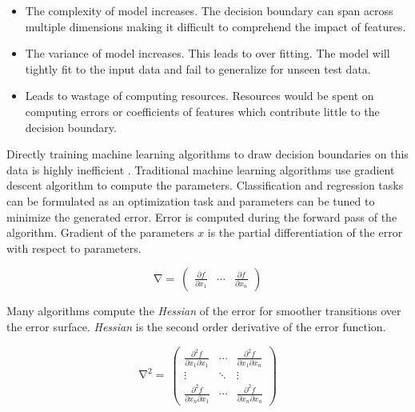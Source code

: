 \documentclass[sigconf]{acmart}
\begin{document}
\begin{itemize}

\item The complexity of model increases. The decision boundary can span across multiple dimensions making it difficult to comprehend the impact of features.

\item The variance of model increases. This leads to over fitting. The model will tightly fit to the input data and fail to generalize for unseen test data.

\item Leads to wastage of computing resources. Resources would be spent on computing errors or coefficients of features which contribute little to the decision boundary.

\end{itemize}

Directly training machine learning algorithms to draw decision boundaries on this data is highly inefficient \cite{Bottou2010}. Traditional machine learning algorithms use gradient descent algorithm to compute the parameters. Classification and regression tasks can be formulated as an optimization task and parameters can be tuned to minimize the generated error. Error is computed during the forward pass of the algorithm. Gradient of the parameters $x$ is the partial differentiation of the error with respect to parameters.

\[\mathrm{\nabla = } \ \begin{pmatrix}\frac{\partial f}{\partial x_1} & \cdots & \frac{\partial f}{\partial x_n}\end{pmatrix}\]


Many algorithms compute the \textit{Hessian} of the error for smoother transitions over the error surface. \textit{Hessian} is the second order derivative of the error function.

\[\mathrm{\nabla^2 = } \ \begin{pmatrix}\frac{\partial^2f}{\partial x_1 \partial x_1} & \cdots & \frac{\partial^2f}{\partial x_1 \partial x_n} \\ \vdots & \ddots & \vdots \\ \frac{\partial^2f}{\partial x_n \partial x_1} & \cdots & \frac{\partial^2f}{\partial x_n \partial x_n}\end{pmatrix}\]
\end{document}
